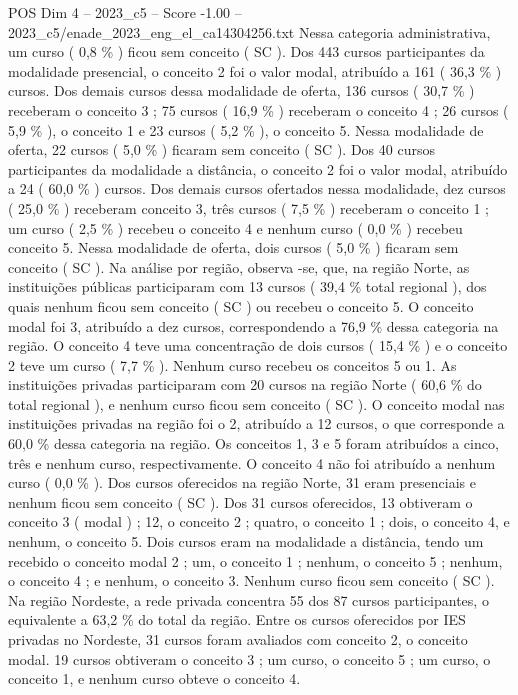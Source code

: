 \begin{textsample}{POS Dim 4 – 2023\_c5 – Score -1.00 – 2023\_c5/enade\_2023\_eng\_el\_ca14304256.txt}
Nessa categoria administrativa, um curso ( 0,8 \% ) ficou sem conceito ( SC ).
Dos 443 cursos participantes da modalidade presencial, o conceito 2 foi o valor modal, atribuído a 161 ( 36,3 \% ) cursos.
Dos demais cursos dessa modalidade de oferta, 136 cursos ( 30,7 \% ) receberam o conceito 3 ; 75 cursos ( 16,9 \% ) receberam o conceito 4 ; 26 cursos ( 5,9 \% ), o conceito 1 e 23 cursos ( 5,2 \% ), o conceito 5.
Nessa modalidade de oferta, 22 cursos ( 5,0 \% ) ficaram sem conceito ( SC ).
Dos 40 cursos participantes da modalidade a distância, o conceito 2 foi o valor modal, atribuído a 24 ( 60,0 \% ) cursos.
Dos demais cursos ofertados nessa modalidade, dez cursos ( 25,0 \% ) receberam conceito 3, três cursos ( 7,5 \% ) receberam o conceito 1 ; um curso ( 2,5 \% ) recebeu o conceito 4 e nenhum curso ( 0,0 \% ) recebeu conceito 5.
Nessa modalidade de oferta, dois cursos ( 5,0 \% ) ficaram sem conceito ( SC ).
Na análise por região, observa -se, que, na região Norte, as instituições públicas participaram com 13 cursos ( 39,4 \% total regional ), dos quais nenhum ficou sem conceito ( SC ) ou recebeu o conceito 5.
O conceito modal foi 3, atribuído a dez cursos, correspondendo a 76,9 \% dessa categoria na região.
O conceito 4 teve uma concentração de dois cursos ( 15,4 \% ) e o conceito 2 teve um curso ( 7,7 \% ).
Nenhum curso recebeu os conceitos 5 ou 1.
As instituições privadas participaram com 20 cursos na região Norte ( 60,6 \% do total regional ), e nenhum curso ficou sem conceito ( SC ).
O conceito modal nas instituições privadas na região foi o 2, atribuído a 12 cursos, o que corresponde a 60,0 \% dessa categoria na região.
Os conceitos 1, 3 e 5 foram atribuídos a cinco, três e nenhum curso, respectivamente.
O conceito 4 não foi atribuído a nenhum curso ( 0,0 \% ).
Dos cursos oferecidos na região Norte, 31 eram presenciais e nenhum ficou sem conceito ( SC ).
Dos 31 cursos oferecidos, 13 obtiveram o conceito 3 ( modal ) ; 12, o conceito 2 ; quatro, o conceito 1 ; dois, o conceito 4, e nenhum, o conceito 5.
Dois cursos eram na modalidade a distância, tendo um recebido o conceito modal 2 ; um, o conceito 1 ; nenhum, o conceito 5 ; nenhum, o conceito 4 ; e nenhum, o conceito 3.
Nenhum curso ficou sem conceito ( SC ).
Na região Nordeste, a rede privada concentra 55 dos 87 cursos participantes, o equivalente a 63,2 \% do total da região.
Entre os cursos oferecidos por IES privadas no Nordeste, 31 cursos foram avaliados com conceito 2, o conceito modal. 19 cursos obtiveram o conceito 3 ; um curso, o conceito 5 ; um curso, o conceito 1, e nenhum curso obteve o conceito 4.

\end{textsample}
